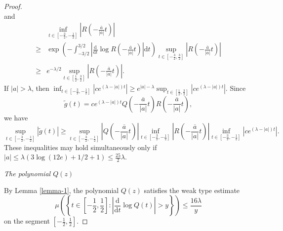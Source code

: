 \begin{proof}
\begin{equation*}
  \end{equation*}
  and 
  \begin{equation*}
    \begin{aligned}
     & \inf_{t\in \left[ -\frac{3}{2},-\frac{1}{2} \right] }\left| R\left( -\frac{\overline{a}}{\left| a \right| }t \right)  \right|\\
    \ge  & \exp \left( -\int_{-3 /2}^{3 /2}\left| \frac{\mathrm{d}}{\mathrm{d}t}\log R\left( - \frac{\overline{a}}{\left| a \right| }t \right)  \right| \mathrm{d}t \right) \sup_{t\in \left[ -\frac{3}{2},\frac{3}{2} \right] }\left| R\left( - \frac{\overline{a}}{\left| a \right| }t \right)  \right| \\
    \ge & e^{-\lambda /2}\sup_{t\in \left[ \frac{1}{2},\frac{3}{2} \right] }\left| R\left( - \frac{\overline{a}}{\left| a \right| }t \right)  \right| .
  \end{aligned}
  \end{equation*}
  If $\left| a \right| >\lambda$, then $\inf_{t\in \left[ -\frac{3}{2},-\frac{1}{2} \right] }\left| ce^{\left( \lambda-\left| a \right|  \right) t} \right| \ge  e^{\left| a \right| -\lambda}\sup_{t\in \left[ \frac{1}{2},\frac{3}{2} \right] }\left| ce^{\left( \lambda-\left| a \right|  \right) t} \right| $. Since 
  \[
    \tilde{g}(t)=ce^{\left( \lambda-|a| \right) t}Q\left( - \frac{\overline{a}}{|a|}t \right)R\left( - \frac{\overline{a}}{|a|}t \right) , 
  \]
  we have 
  \begin{equation*}
      \sup_{t\in\left[-\frac{3}{2},-\frac{1}{2}\right]}\left|\tilde{g}(t)\right| \ge   \sup_{t\in \left[ -\frac{3}{2},-\frac{1}{2} \right] }\left| Q\left( - \frac{\overline{a}}{\left| a \right| }t \right)  \right| \inf_{t\in \left[ -\frac{3}{2},-\frac{1}{2} \right] }\left| R\left( - \frac{\overline{a}}{|a|}t \right)  \right| \inf_{t\in \left[ -\frac{3}{2},-\frac{1}{2} \right] }\left| ce^{\left( \lambda -|a| \right) t} \right|. 
  \end{equation*}
  These inequalities may hold simultaneously only if $\left| a \right| \le \lambda \left( 3\log (12e)+1 /2+1 \right) \le \frac{25}{2}\lambda$.

  \textit{The polynomial $Q(z)$}

  By Lemma \ref{lemma-1}, the polynomial $Q(z)$ satisfies the weak type estimate 
  \[
    \mu\left( \left\{ t\in \left[ -\frac{1}{2},\frac{1}{2} \right] :\left| \frac{\mathrm{d}}{\mathrm{d}t}\log Q(t) \right| >y \right\}  \right) \le \frac{16\lambda}{y}
  \] on the segment $\left[ -\frac{1}{2},\frac{1}{2} \right] $.


\end{proof}
